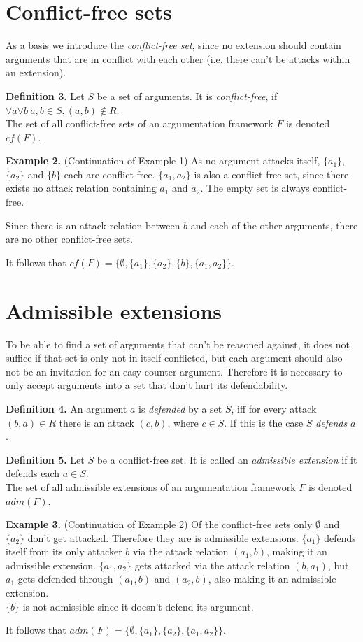 \documentclass[draft,final]{vutinfth} %
\newcommand{\hl}{\par\vspace{6pt}} %
\newcommand{\cl}{\par\vspace{12pt}} %
\begin{document}
\section{Conflict-free sets}

As a basis we introduce the \emph{conflict-free set}, since no extension should contain arguments that are in conflict with each other (i.e. there can't be attacks within an extension).\cl

\textbf{Definition 3.} Let $S$ be a set of arguments. It is \emph{conflict-free}, if $\forall a \forall b\ a,b\in S, (a,b)\notin R$.\\
The set of all conflict-free sets of an argumentation framework $F$ is denoted $cf(F)$.\cl

\textbf{Example 2.} (Continuation of Example 1) As no argument attacks itself, $\{a_1\}$, $\{a_2\}$ and $\{b\}$ each are conflict-free. $\{a_1,a_2\}$ is also a conflict-free set, since there exists no attack relation containing $a_1$ and $a_2$. The empty set is always conflict-free.\hl
Since there is an attack relation between $b$ and each of the other arguments, there are no other conflict-free sets.\hl
It follows that $cf(F)=\{\emptyset,\{a_1\},\{a_2\},\{b\},\{a_1,a_2\}\}$.\cl

\section{Admissible extensions}

To be able to find a set of arguments that can't be reasoned against, it does not suffice if that set is only not in itself conflicted, but each argument should also not be an invitation for an easy counter-argument. Therefore it is necessary to only accept arguments into a set that don't hurt its defendability.\cl

\textbf{Definition 4.} An argument $a$ is \emph{defended} by a set $S$, iff for every attack $(b,a)\in R$ there is an attack $(c,b)$, where $c\in S$. If this is the case $S$ \emph{defends} $a$.\cl

\textbf{Definition 5.} Let $S$ be a conflict-free set. It is called an \emph{admissible extension} if it defends each $a\in S$.\\
The set of all admissible extensions of an argumentation framework $F$ is denoted $adm(F)$.\cl

\textbf{Example 3.} (Continuation of Example 2) Of the conflict-free sets only \(\emptyset\) and $\{a_2\}$ don't get attacked. Therefore they are is admissible extensions. $\{a_1\}$ defends itself from its only attacker $b$ via the attack relation $(a_1,b)$, making it an admissible extension. $\{a_1,a_2\}$ gets attacked via the attack relation $(b,a_1)$, but $a_1$ gets defended through $(a_1,b)$ and $(a_2,b)$, also making it an admissible extension.\\
$\{b\}$ is not admissible since it doesn't defend its argument.\hl
It follows that $adm(F)=\{\emptyset,\{a_1\},\{a_2\},\{a_1,a_2\}\}$.\cl
\end{document}
